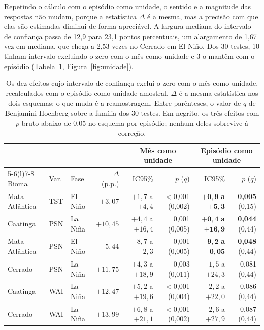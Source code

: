\documentclass[a4paper,fleqn]{cas-sc}
\begin{document}
Repetindo o cálculo com o episódio como unidade, o sentido e a magnitude das respostas não mudam, porque a estatística $\Delta$ é a mesma, mas a precisão com que elas são estimadas diminui de forma apreciável. A largura mediana do intervalo de confiança passa de 12,9 para 23,1 pontos percentuais, um alargamento de 1,67 vez em mediana, que chega a 2,53 vezes no Cerrado em El Niño. Dos 30 testes, 10 tinham intervalo excluindo o zero com o mês como unidade e 3 o mantêm com o episódio (Tabela~\ref{tab:unidade}, Figura~\ref{fig:unidade}).

\begin{table}[width=\textwidth,cols=8,pos=t]
\caption{Os dez efeitos cujo intervalo de confiança exclui o zero com o mês como unidade, recalculados com o episódio como unidade amostral. $\Delta$ é a mesma estatística nos dois esquemas; o que muda é a reamostragem. Entre parênteses, o valor de $q$ de Benjamini-Hochberg sobre a família dos 30 testes. Em negrito, os três efeitos com $p$ bruto abaixo de 0,05 no esquema por episódio; nenhum deles sobrevive à correção.}
\label{tab:unidade}
\begin{tabular*}{\tblwidth}{@{}lllrrrrr@{}}
\toprule
 & & & & \multicolumn{2}{c}{Mês como unidade} & \multicolumn{2}{c}{Episódio como unidade} \\
\cmidrule(lr){5-6}\cmidrule(l){7-8}
Bioma & Var. & Fase & $\Delta$ (p.p.) & IC95\% & $p$ ($q$) & IC95\% & $p$ ($q$) \\
\midrule
Mata Atlântica & TST & El Niño & $+3{,}07$  & $+1{,}7$ a $+4{,}4$  & $<$0,001 (0,002) & $\mathbf{+0{,}9}$ \textbf{a} $\mathbf{+5{,}3}$ & \textbf{0,005} (0,15) \\
Caatinga       & PSN & La Niña & $+10{,}45$ & $+4{,}4$ a $+16{,}4$ & 0,001 (0,005) & $\mathbf{+0{,}4}$ \textbf{a} $\mathbf{+16{,}9}$ & \textbf{0,044} (0,44) \\
Mata Atlântica & PSN & El Niño & $-5{,}44$  & $-8{,}7$ a $-2{,}3$  & 0,001 (0,005) & $\mathbf{-9{,}2}$ \textbf{a} $\mathbf{-0{,}05}$ & \textbf{0,048} (0,44) \\
\addlinespace
Cerrado        & PSN & La Niña & $+11{,}75$ & $+4{,}3$ a $+18{,}9$ & 0,003 (0,011) & $-1{,}5$ a $+24{,}3$ & 0,081 (0,44) \\
Caatinga       & WAI & La Niña & $+12{,}47$ & $+5{,}2$ a $+19{,}6$ & $<$0,001 (0,004) & $-2{,}2$ a $+22{,}0$ & 0,086 (0,44) \\
Cerrado        & WAI & La Niña & $+13{,}99$ & $+6{,}8$ a $+21{,}1$ & $<$0,001 (0,002) & $-2{,}6$ a $+27{,}9$ & 0,087 (0,44) \\

\end{tabular*}
\end{table}
\end{document}

